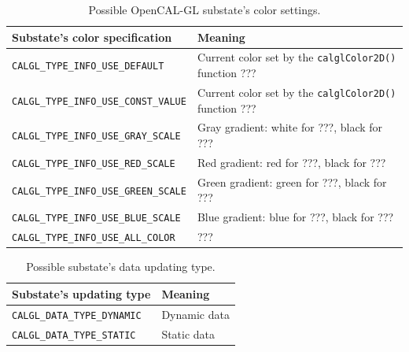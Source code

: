 \begin{table}
  \centering
  \footnotesize
  \begin{tabular}{l|l}
    \hline
    Substate's color specification & Meaning \\
    \hline
    \hline
    \verb'CALGL_TYPE_INFO_USE_DEFAULT'     & Current color set by the \verb'calglColor2D()' function ???\\
    \verb'CALGL_TYPE_INFO_USE_CONST_VALUE' & Current color set by the \verb'calglColor2D()' function ???\\
    \verb'CALGL_TYPE_INFO_USE_GRAY_SCALE'  & Gray gradient: white for ???, black for ???\\
    \verb'CALGL_TYPE_INFO_USE_RED_SCALE '  & Red gradient: red for ???, black for ???\\
    \verb'CALGL_TYPE_INFO_USE_GREEN_SCALE' & Green gradient: green for ???, black for ???\\
    \verb'CALGL_TYPE_INFO_USE_BLUE_SCALE'  & Blue gradient: blue for ???, black for ???\\
    \verb'CALGL_TYPE_INFO_USE_ALL_COLOR'   & ???\\
    \hline
  \end{tabular}
  \caption{Possible OpenCAL-GL substate's color settings.}
  \label{tab:substate_color_info}
\end{table} 

\begin{table}
  \centering
  \small
  \begin{tabular}{l|l}
    \hline
    Substate's updating type & Meaning \\
    \hline
    \hline
    \verb'CALGL_DATA_TYPE_DYNAMIC' & Dynamic data\\
    \verb'CALGL_DATA_TYPE_STATIC'  & Static data\\
    \hline
  \end{tabular}
  \caption{Possible substate's data updating type.}
  \label{tab:substate_updating_type}
\end{table} 

